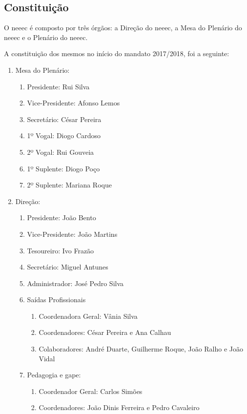 
\subsection{Constituição}

O \acrshort{neeec} é composto por três órgãos: a Direção do \acrshort{neeec}, a Mesa do Plenário do \acrshort{neeec} e o Plenário do \acrshort{neeec}.

A constituição dos mesmos no início do mandato 2017/2018, foi a seguinte:
\begin{enumerate}
\item Mesa do Plenário:
  \begin{enumerate}
  \item Presidente: Rui Silva
  \item Vice-Presidente: Afonso Lemos
  \item Secretário: César Pereira
  \item 1º Vogal: Diogo Cardoso
  \item 2º Vogal: Rui Gouveia
  \item 1º Suplente: Diogo Poço
  \item 2º Suplente: Mariana Roque
  \end{enumerate}
\item Direção:
  \begin{enumerate}
  \item Presidente: João Bento
  \item Vice-Presidente: João Martins
  \item Tesoureiro: Ivo Frazão
  \item Secretário: Miguel Antunes
  \item Administrador: José Pedro Silva
  \item Saídas Profissionais
    \begin{enumerate}
    \item Coordenadora Geral: Vânia Silva
    \item Coordenadores: César Pereira e Ana Calhau
    \item Colaboradores: André Duarte, Guilherme Roque, João Ralho e João Vidal
    \end{enumerate}
  \item Pedagogia e \acrshort{gape}:
    \begin{enumerate}
    \item Coordenador Geral: Carlos Simões
    \item Coordenadores: João Dinis Ferreira e Pedro Cavaleiro

\end{enumerate}
\end{enumerate}
\end{enumerate}
